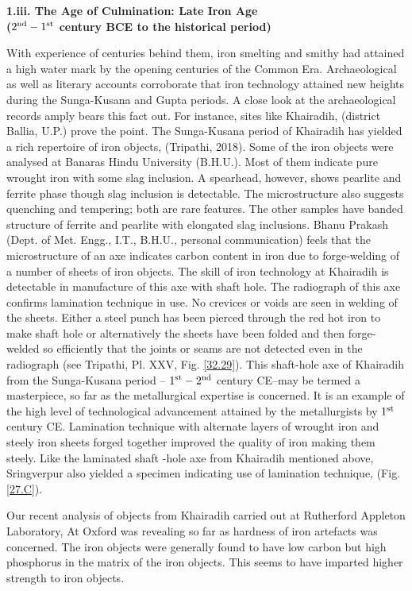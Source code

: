 \textbf{1.iii. The Age of Culmination: Late Iron Age\\ ($2^{\rm nd} -1^{\rm st}$ century BCE to the historical period)}

With experience of centuries behind them, iron smelting and smithy had attained a high water mark by the opening centuries of the Common Era. Archaeological as well as literary accounts corroborate that iron technology attained new heights during the Sunga-Kusana and Gupta periods. A close look at the archaeological records amply bears this fact out. For instance, sites like Khairadih, (district Ballia, U.P.) prove the point. The Sunga-Kusana period of Khairadih has yielded a rich repertoire of iron objects, (Tripathi, 2018). Some of the iron objects were analysed at Banaras Hindu University (B.H.U.). Most of them indicate pure wrought iron with some slag inclusion. A spearhead, however, shows pearlite and ferrite phase though slag inclusion is detectable. The microstructure also suggests quenching and tempering; both are rare features. The other samples have banded structure of ferrite and pearlite with elongated slag inclusions. Bhanu Prakash (Dept. of Met. Engg., I.T., B.H.U., personal communication) feels that the microstructure of an axe indicates carbon content in iron due to forge-welding of a number of sheets of iron objects. The skill of iron technology at Khairadih is detectable in manufacture of this axe with shaft hole. The radiograph of this axe confirms lamination technique in use. No crevices or voids are seen in welding of the sheets. Either a steel punch has been pierced through the red hot iron to make shaft hole or alternatively the sheets have been folded and then forge-welded so efficiently that the joints or seams are not detected even in the radiograph (see Tripathi, Pl. XXV, Fig. \ref{32.29}). This shaft-hole axe of Khairadih from the Sunga-Kusana period – $1^{\rm st}  -2^{\rm nd}$ century CE–may be termed a masterpiece, so far as the metallurgical expertise is concerned. It is an example of the high level of technological advancement attained by the metallurgists by $1^{\rm st}$ century CE. Lamination technique with alternate layers of wrought iron and steely iron sheets forged together improved the quality of iron making them steely. Like the laminated shaft -hole axe from Khairadih mentioned above, Sringverpur also yielded a specimen indicating use of lamination technique, (Fig. \ref{27.C}).

Our recent analysis of objects from Khairadih carried out at Rutherford Appleton Laboratory, At Oxford was revealing so far as hardness of iron artefacts was concerned. The iron objects were generally found to have low carbon but high phosphorus in the matrix of the iron objects. This seems to have imparted higher strength to iron objects.  

